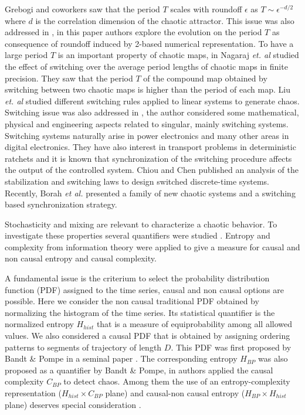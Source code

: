 Grebogi and coworkers \cite{Grebogi1988} saw that the period $T$ scales with roundoff $\epsilon$ as $T\sim\epsilon^{-d/2}$ where $d$ is the correlation dimension of the chaotic attractor.
This issue was also addressed in \cite{Persohn2012}, in this paper authors explore the evolution on the period $T$ as consequence of roundoff induced by 2-based numerical representation.
To have a large period $T$ is an important property of chaotic maps, in \cite{Nagaraj2008} Nagaraj \textit{et. al} studied the effect of switching over the average period lengths of chaotic maps in finite precision.
They saw that the period $T$ of the compound map obtained by switching between two chaotic maps is higher than the period of each map.
Liu \textit{et. al} \cite{Liu2006} studied different switching rules applied to linear systems to generate chaos.
Switching issue was also addressed in \cite{Gluskin2008}, the author considered some mathematical, physical and engineering aspects related to singular, mainly switching systems.
Switching systems naturally arise in power electronics and many other areas in digital electronics.
They have also interest in transport problems in deterministic ratchets \cite{Zarlenga2009} and it is known that synchronization of the switching procedure affects the output of the controlled system.
Chiou and Chen \cite{Chiou2009} published an analysis of the stabilization and switching laws to design switched discrete-time systems.
Recently, Borah \textit{et al.} \cite{Borah2017} presented a family of new chaotic systems and a switching based synchronization strategy.

Stochasticity and mixing are relevant to characterize a chaotic behavior.
To investigate these properties several quantifiers were studied \cite{DeMicco2009}.
Entropy and complexity from information theory were applied to give a measure for causal and non causal entropy and causal complexity.

A fundamental issue is the criterium to select the probability distribution function (PDF) assigned to the time series, causal and non causal options are possible.
Here we consider the non causal traditional PDF obtained by normalizing the histogram of the time series.
Its statistical quantifier is the normalized entropy $H_{hist}$ that is a measure of equiprobability among all allowed values.
We also considered a causal PDF that is obtained by assigning ordering patterns to segments of trajectory of length $D$.
This PDF was first proposed by Bandt \& Pompe in a seminal paper \cite{Bandt2002}.
The corresponding entropy $H_{BP}$ was also proposed as a quantifier by Bandt \& Pompe, in \cite{Rosso2007} authors applied the causal complexity $C_{BP}$ to detect chaos.
Among them the use of an entropy-complexity representation ($H_{hist} \times C_{BP}$ plane) and causal-non causal entropy ($H_{BP} \times H_{hist}$ plane) deserves special consideration \cite{DeMicco2009,Rosso2007,DeMicco2008,DeMicco2012,Rosso2007a,Rosso2010,Antonelli2017}.

